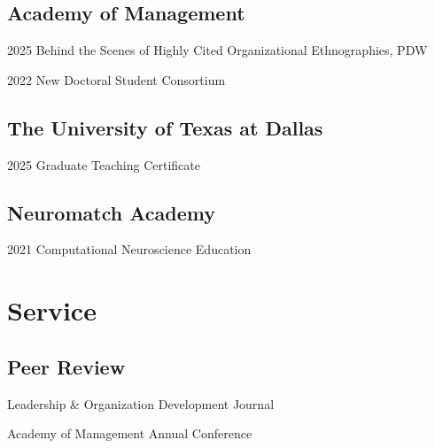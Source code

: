 \documentclass[12pt,letterpaper]{report} %
\newcommand{\listitemspace}{0.2em}
\renewenvironment{itemize}
{\begin{list}{}{\setlength{\leftmargin}{0em}
                \setlength{\parskip}{0em}
                \setlength{\itemsep}{\listitemspace}
                \setlength{\parsep}{\listitemspace}}}
{\end{list}}
\begin{document}
    \subsection*{Academy of Management}

    \begin{tablist}
        \item[2025]\tab{}Behind the Scenes of Highly Cited Organizational Ethnographies, PDW
        \item[2022]\tab{}New Doctoral Student Consortium
        
    \end{tablist}


    \subsection*{The University of Texas at Dallas}

    \begin{tablist}

        \item[2025]\tab{}Graduate Teaching Certificate

    \end{tablist}


    \subsection*{Neuromatch Academy}

    \begin{tablist}
        \item[2021]\tab{}Computational Neuroscience Education
        
    \end{tablist}
    \section*{Service}


    \subsection*{Peer Review}

    \begin{itemize}

        \item Leadership \& Organization Development Journal
        
        \item Academy of Management Annual Conference
        
    \end{itemize}
\end{document}
